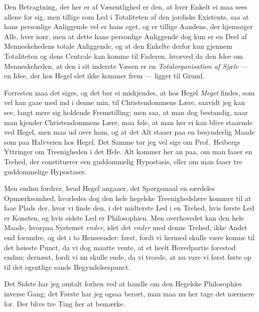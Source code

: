 \documentclass[12pt,a4paper]{book}
\newcommand{\apage}[1]{\marginnote{\footnotesize\textit{[#1]}}}
\begin{document}
Den Betragtning, der her er af Væsentlighed er den, at hver Enkelt ei maa sees
allene for sig, men tillige som Led i Totaliteten af den jordiske Existents, saa
at hans personlige Anliggende vel er hans eget, og er tillige Aandens, der
hjemsøger Alle, hver især, men at dette hans personlige Anliggende dog kun er en
Deel af Menneskehedens totale Anliggende, og at den Enkelte derfor kun gjennem
Totaliteten og dens Centrale kan komme til Faderen, hvorved da den Idee om
Menneskeheden, at den i sit inderste Væsen er en \emph{Totalorganisation af Sjæle} --- en
Idee, der hos Hegel slet ikke kommer frem --- ligger til Grund.

Forresten maa det siges, og det bør ei miskjendes, at hos Hegel \emph{Meget} findes, som
vel kan gaae med ind i denne min, til Christendommens Lære, saavidt jeg kan see,
langt mere sig holdende Fremstilling; men saa, at man dog bestandig, naar man
kjender Christendommens Lære, maa føle, at man her ei kan blive staaende ved Hegel,
men maa ud over ham, og at det Alt staaer paa en besynderlig Maade som paa
Halvveien hos Hegel. Det Samme tør jeg vel sige om Prof.\ Heibergs Yttringer om
Treenigheden i det Hele. Alt kommer her an paa, om man faaer en Trehed, der
constituerer een guddommelig Hypostasis, eller om man faaer tre guddommelige
Hypostaser.

Men endnu fordrer, hvad Hegel angaaer, det Spørgsmaal en særdeles Opmærksomhed,
hvorledes dog den hele hegelske Treenighedslære kommer til at faae Plads der, hvor
vi finde den, i det midterste Led i en Trehed, hvis første Led er Konsten, og hvis
sidste Led er Philosophien. Men overhovedet kan den hele Maade, hvorpaa \apage{148} Systemet
\emph{ender}, idet det \emph{ender} med denne Trehed, ikke Andet end forundre, og det i to
Henseender: først, fordi vi hermed skulle være komne til det høieste Punct, da vi
dog maatte vente, at et heelt Hovedpartie forestod endnu; dernæst, fordi vi nu
skulle ende, da vi troede, at nu vare vi først førte op til det egentlige sande
Begyndelsespunct.

Det Sidste har jeg omtalt forhen ved at handle om den Hegelske Philosophies
inverse Gang; det Første har jeg ogsaa berørt, man maa nu her tage det nærmere
for. Der blive tre Ting her at bemærke.
\end{document}
